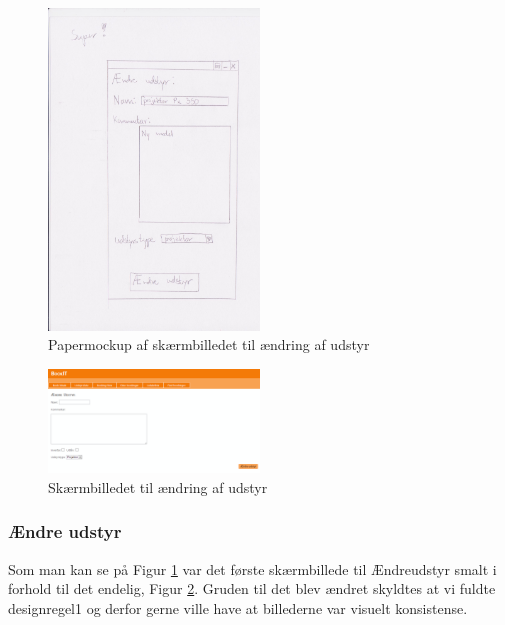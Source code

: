 \begin{figure}[h!]
  \centering
    \includegraphics[width=0.5\textwidth]{Appendix/GUI-Prototype/PaperMockup/AendreUdstyr_001}
  \caption{Papermockup af skærmbilledet til ændring af udstyr}
\label{Design_G_Development_EquipmentChange}
\end{figure} 

\begin{figure}[h!]
  \centering
    \includegraphics[width=0.5\textwidth]{Appendix/GUI-Prototype/DigitalMockup/AendreUdstyr}
  \caption{Skærmbilledet til ændring af udstyr}
\label{Design_G_Development_EquipmentChange_Final}
\end{figure} 

\subsubsection{Ændre udstyr}
Som man kan se på Figur \ref{Design_G_Development_EquipmentChange} var det første skærmbillede til Ændreudstyr smalt i forhold til det endelig, Figur \ref{Design_G_Development_EquipmentChange_Final}. Gruden til det blev ændret skyldtes at vi fuldte designregel1 og derfor gerne ville have at billederne var visuelt konsistense. 

